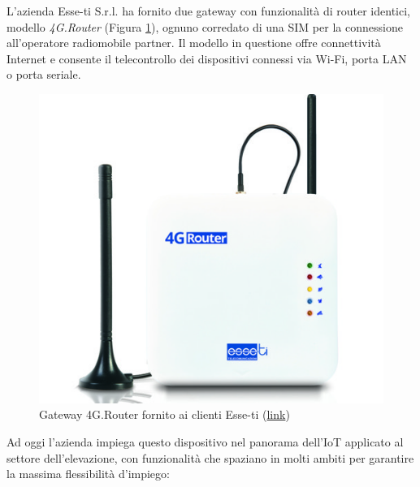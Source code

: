 L'azienda Esse-ti S.r.l. ha fornito due gateway con funzionalità di router identici, modello \textit{4G.Router} (Figura \ref{fig:router}), ognuno corredato di una SIM per la connessione all'operatore radiomobile partner. Il modello in questione offre  connettività Internet e consente il telecontrollo dei dispositivi connessi via Wi-Fi, porta LAN o porta seriale.
\begin{figure}[ht]
	\centering
	\includegraphics[scale=0.4]{immagini/router_esse_ti.jpg}
	\caption{Gateway 4G.Router fornito ai clienti Esse-ti
		(\href{https://www.esse-ti.it/4g-router}{link})}
	\label{fig:router}
\end{figure}
Ad oggi l'azienda impiega questo dispositivo nel panorama dell'IoT applicato al settore dell'elevazione, con funzionalità che spaziano in molti ambiti per garantire la massima flessibilità d'impiego:
